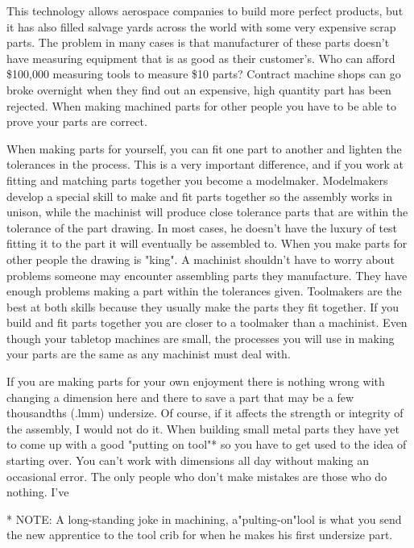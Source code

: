 
This technology allows aerospace companies to build more perfect products, but
it has also filled salvage yards across the world with some very expensive scrap
parts. The problem in many cases is that manufacturer of these parts doesn't
have measuring equipment that is as good as their customer's. Who can afford
\$100,000 measuring tools to measure \$10 parts? Contract machine shops can go
broke overnight when they find out an expensive, high quantity part has been
rejected. When making machined parts for other people you have to be able to
prove your parts are correct.

When making parts for yourself, you can fit one part to another and lighten the
tolerances in the process. This is a very important difference, and if you work
at fitting and matching parts together you become a modelmaker. Modelmakers
develop a special skill to make and fit parts together so the assembly works in
unison, while the machinist will produce close tolerance parts that are within
the tolerance of the part drawing. In most cases, he doesn't have the luxury of
test fitting it to the part it will eventually be assembled to. When you make
parts for other people the drawing is "king". A machinist shouldn't have to
worry about problems someone may encounter assembling parts they manufacture.
They have enough problems making a part within the tolerances given. Toolmakers
are the best at both skills because they usually make the parts they fit
together. If you build and fit parts together you are closer to a toolmaker than
a machinist. Even though your tabletop machines are small, the processes you
will use in making your parts are the same as any machinist must deal with.


If you are making parts for your own enjoyment there is nothing wrong with
changing a dimension here and there to save a part that may be a few thousandths
(.lmm) undersize. Of course, if it affects the strength or integrity of the
assembly, I would not do it. When building small metal parts they have yet to
come up with a good "putting on tool"* so you have to get used to the idea of
starting over. You can't work with dimensions all day without making an
occasional error. The only people who don't make mistakes are those who do
nothing. I've

\bigskip
* NOTE: A long-standing joke in machining, a"pulting-on"lool is what you send
the new apprentice to the tool crib for when he makes his first undersize part.
\bigskip

